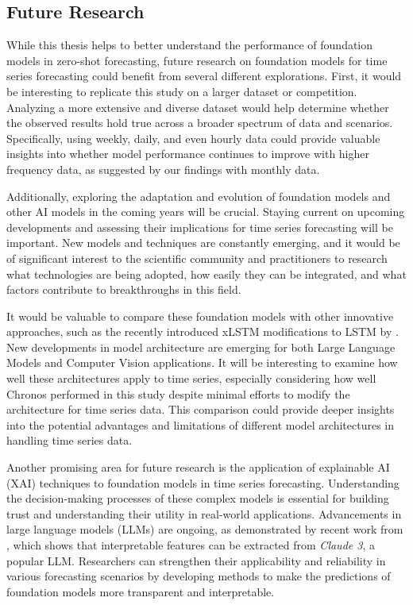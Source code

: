 \documentclass[12pt,a4paper]{article}
\begin{document}
\subsection{Future Research}

While this thesis helps to better understand the performance of foundation models in zero-shot forecasting, future research on foundation models for time series forecasting could benefit from several different explorations. First, it would be interesting to replicate this study on a larger dataset or competition. Analyzing a more extensive and diverse dataset would help determine whether the observed results hold true across a broader spectrum of data and scenarios. Specifically, using weekly, daily, and even hourly data could provide valuable insights into whether model performance continues to improve with higher frequency data, as suggested by our findings with monthly data. 

Additionally, exploring the adaptation and evolution of foundation models and other AI models in the coming years will be crucial. Staying current on upcoming developments and assessing their implications for time series forecasting will be important. New models and techniques are constantly emerging, and it would be of significant interest to the scientific community and practitioners to research what technologies are being adopted, how easily they can be integrated, and what factors contribute to breakthroughs in this field.

It would be valuable to compare these foundation models with other innovative approaches, such as the recently introduced xLSTM modifications to LSTM by \cite{beck2024xlstm}. New developments in model architecture are emerging for both Large Language Models and Computer Vision applications. It will be interesting to examine how well these architectures apply to time series, especially considering how well Chronos performed in this study despite minimal efforts to modify the architecture for time series data. This comparison could provide deeper insights into the potential advantages and limitations of different model architectures in handling time series data.

Another promising area for future research is the application of explainable AI (XAI) techniques to foundation models in time series forecasting. Understanding the decision-making processes of these complex models is essential for building trust and understanding their utility in real-world applications. Advancements in large language models (LLMs) are ongoing, as demonstrated by recent work from \cite{templeton2024scaling}, which shows that interpretable features can be extracted from \textit{Claude 3}, a popular LLM. Researchers can strengthen their applicability and reliability in various forecasting scenarios by developing methods to make the predictions of foundation models more transparent and interpretable.
\end{document}
